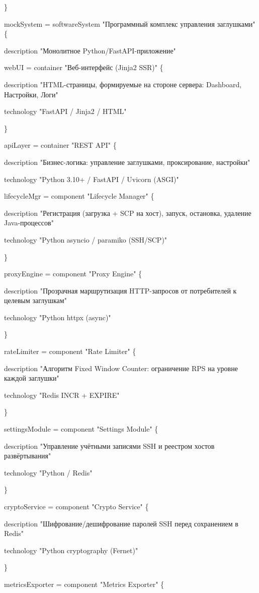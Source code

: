 \documentclass[
]{article}
\begin{document}
\}

mockSystem = softwareSystem "Программный комплекс управления заглушками"
\{

description "Монолитное Python/FastAPI-приложение"

webUI = container "Веб-интерфейс (Jinja2 SSR)" \{

description "HTML-страницы, формируемые на стороне сервера: Dashboard,
Настройки, Логи"

technology "FastAPI / Jinja2 / HTML"

\}

apiLayer = container "REST API" \{

description "Бизнес-логика: управление заглушками, проксирование,
настройки"

technology "Python 3.10+ / FastAPI / Uvicorn (ASGI)"

lifecycleMgr = component "Lifecycle Manager" \{

description "Регистрация (загрузка + SCP на хост), запуск, остановка,
удаление Java-процессов"

technology "Python asyncio / paramiko (SSH/SCP)"

\}

proxyEngine = component "Proxy Engine" \{

description "Прозрачная маршрутизация HTTP-запросов от потребителей к
целевым заглушкам"

technology "Python httpx (async)"

\}

rateLimiter = component "Rate Limiter" \{

description "Алгоритм Fixed Window Counter: ограничение RPS на уровне
каждой заглушки"

technology "Redis INCR + EXPIRE"

\}

settingsModule = component "Settings Module" \{

description "Управление учётными записями SSH и реестром хостов
развёртывания"

technology "Python / Redis"

\}

cryptoService = component "Crypto Service" \{

description "Шифрование/дешифрование паролей SSH перед сохранением в
Redis"

technology "Python cryptography (Fernet)"

\}

metricsExporter = component "Metrics Exporter" \{
\end{document}
